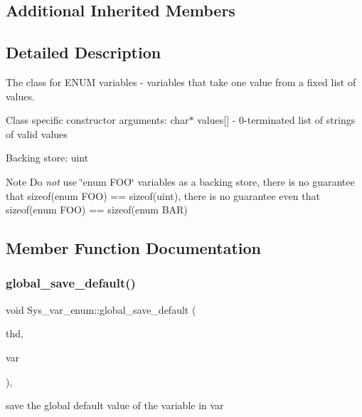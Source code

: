 \subsection*{Additional Inherited Members}


\subsection{Detailed Description}
The class for E\+N\+UM variables -\/ variables that take one value from a fixed list of values.

Class specific constructor arguments\+: char$\ast$ values\mbox{[}\mbox{]} -\/ 0-\/terminated list of strings of valid values

Backing store\+: uint

\begin{DoxyNote}{Note}
Do {\itshape not} use \char`\"{}enum F\+O\+O\char`\"{} variables as a backing store, there is no guarantee that sizeof(enum F\+O\+O) == sizeof(uint), there is no guarantee even that sizeof(enum F\+O\+O) == sizeof(enum B\+A\+R) 
\end{DoxyNote}


\subsection{Member Function Documentation}
\mbox{\label{classSys__var__enum_a92bd0f6a0c19af8b437fa2ee81c92c72}} 
\subsubsection{\texorpdfstring{global\+\_\+save\+\_\+default()}{global\_save\_default()}}
{\footnotesize\ttfamily void Sys\+\_\+var\+\_\+enum\+::global\+\_\+save\+\_\+default (\begin{DoxyParamCaption}\item[{T\+HD $\ast$}]{thd,  }\item[{\mbox{\hyperlink{classset__var}{set\+\_\+var}} $\ast$}]{var }\end{DoxyParamCaption})\hspace{0.3cm}{\ttfamily [inline]}, {\ttfamily [virtual]}}

save the global default value of the variable in var 

